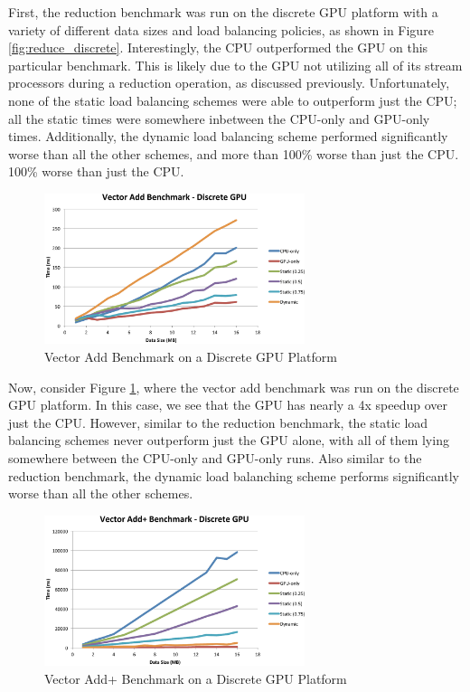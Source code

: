 \documentclass[journal]{IEEEtran}
\begin{document}
First, the reduction benchmark was run on the discrete GPU platform with a variety of
different data sizes and load balancing policies, as shown in Figure \ref{fig:reduce_discrete}.
Interestingly, the CPU outperformed the GPU on this particular benchmark.  This is likely
due to the GPU not utilizing all of its stream processors during a reduction operation, as
discussed previously.  Unfortunately, none of the static load balancing schemes were able
to outperform just the CPU; all the static times were somewhere inbetween the CPU-only and
GPU-only times.  Additionally, the dynamic load balancing scheme performed significantly
worse than all the other schemes, and more than 100\% worse than just the CPU.
100\% worse than just the CPU.

\begin{figure}[t]
\centering
\includegraphics[width=3.0in]{vector_discrete}
\caption{Vector Add Benchmark on a Discrete GPU Platform}
\label{fig:vector_discrete}
\end{figure}

Now, consider Figure \ref{fig:vector_discrete}, where the vector add benchmark was run on
the discrete GPU platform.  In this case, we see that the GPU has nearly a 4x speedup over
just the CPU.  However, similar to the reduction benchmark, the static load balancing schemes
never outperform just the GPU alone, with all of them lying somewhere between the CPU-only
and GPU-only runs.  Also similar to the reduction benchmark, the dynamic load balanching scheme
performs significantly worse than all the other schemes.

\begin{figure}[t]
\centering
\includegraphics[width=3.0in]{vector_plus_discrete}
\caption{Vector Add+ Benchmark on a Discrete GPU Platform}
\label{fig:vector_plus_discrete}
\end{figure}
\end{document}
